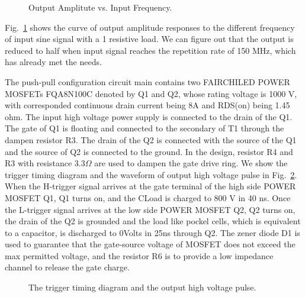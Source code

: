 \documentclass[aip,rsi,reprint,graphicx]{revtex4-1} %
\begin{document}
\begin{figure}[hbt]
{}  
  \caption{Output Amplitute vs. Input Frequency.\label{FIG8}}
\end{figure}

 Fig.~\ref{FIG8} shows the curve of output amplitude responses to the different frequency of input sine signal with a 1 resistive load.
 We can figure out that the output is reduced to half when input signal reaches the repetition rate of 150 MHz, which has already met the needs.


The push-pull configuration circuit main contains two FAIRCHILED POWER MOSFETs FQA8N100C denoted by Q1 and Q2, whose rating voltage is 1000 V, with corresponded continuous drain current being 8A and RDS(on) being 1.45 ohm.
The input high voltage power supply is connected to the drain of the Q1. The gate of Q1 is floating and connected to the secondary of T1 through the dampen resistor R3. 
The drain of the Q2 is connected with the source of the Q1 and the source of Q2 is connected to the ground. 
In the design, resistor R4 and R3 with resistance $3.3 \Omega$ are used to dampen the gate drive ring.
We show the trigger timing diagram and the waveform of output high voltage pulse in Fig.~\ref{FIG2}. 
When the H-trigger signal arrives at the gate terminal of the high side POWER MOSFET Q1, Q1 turns on, and the CLoad is charged to 800 V in 40 ns. 
Once the L-trigger signal arrives at the low side POWER MOSFET Q2, Q2 turns on, the drain of the Q2 is grounded and the load like pockel cells, which is equivalent to a capacitor, is discharged to 0Volts in 25ns through Q2. 
The zener diode D1 is used to guarantee that the gate-source voltage of MOSFET does not exceed the max permitted voltage, and the resistor R6 is to provide a low impedance channel to release the gate charge.
\begin{figure}[hbt]
\caption{The trigger timing diagram and the output high voltage pulse. \label{FIG2}}%
\end{figure}
\end{document}
